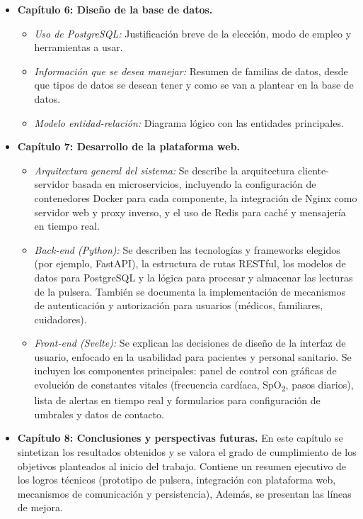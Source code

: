 \documentclass[12pt, a4paper]{article}
\begin{document}
\begin{itemize}
		\item \textbf{Capítulo 6: Diseño de la base de datos.}
		\begin{itemize}
			\item \emph{Uso de PostgreSQL:} Justificación breve de la elección, modo de empleo y herramientas a usar.
			\item \emph{Información que se desea manejar:} Resumen de familias de datos, desde que tipos de datos se desean tener y como se van a plantear en la base de datos.
			\item \emph{Modelo entidad-relación:} Diagrama lógico con las entidades principales.
		\end{itemize}
		
		\item \textbf{Capítulo 7: Desarrollo de la plataforma web.}  
		\begin{itemize}
			\item \emph{Arquitectura general del sistema:} Se describe la arquitectura cliente-servidor basada en microservicios, incluyendo la configuración de contenedores Docker para cada componente, la integración de Nginx como servidor web y proxy inverso, y el uso de Redis para caché y mensajería en tiempo real.
			\item \emph{Back-end (Python):} Se describen las tecnologías y frameworks elegidos (por ejemplo, FastAPI), la estructura de rutas RESTful, los modelos de datos para PostgreSQL y la lógica para procesar y almacenar las lecturas de la pulsera. También se documenta la implementación de mecanismos de autenticación y autorización para usuarios (médicos, familiares, cuidadores).  
			\item \emph{Front-end (Svelte):} Se explican las decisiones de diseño de la interfaz de usuario, enfocado en la usabilidad para pacientes y personal sanitario. Se incluyen los componentes principales: panel de control con gráficas de evolución de constantes vitales (frecuencia cardíaca, SpO\textsubscript{2}, pasos diarios), lista de alertas en tiempo real y formularios para configuración de umbrales y datos de contacto.  
		\end{itemize}
		
		\item \textbf{Capítulo 8: Conclusiones y perspectivas futuras.}  
		En este capítulo se sintetizan los resultados obtenidos y se valora el grado de cumplimiento de los objetivos planteados al inicio del trabajo. Contiene un resumen ejecutivo de los logros técnicos (prototipo de pulsera, integración con plataforma web, mecanismos de comunicación y persistencia), Además, se presentan las líneas de mejora.
		

\end{itemize}
\end{document}
